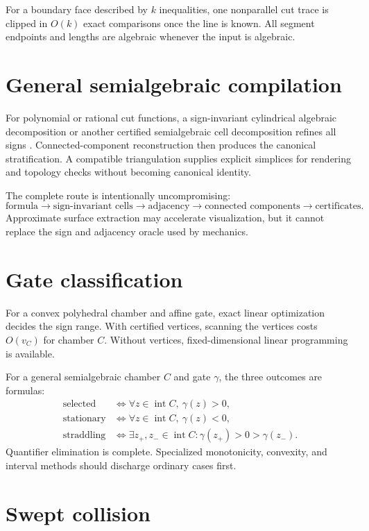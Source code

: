 \documentclass[11pt,openany]{book}
\newcommand{\Int}{\operatorname{int}}
\theoremstyle{polyplain}
\theoremstyle{polydef}
\begin{document}
For a boundary face described by $k$ inequalities, one nonparallel cut trace is clipped in $O(k)$ exact comparisons once the line is known. All segment endpoints and lengths are algebraic whenever the input is algebraic.

\section{General semialgebraic compilation}

For polynomial or rational cut functions, a sign-invariant cylindrical algebraic decomposition or another certified semialgebraic cell decomposition refines all signs \parencite{Collins1975,ArnonCollinsMcCallum1984,BasuPollackRoy2006}. Connected-component reconstruction then produces the canonical stratification. A compatible triangulation supplies explicit simplices for rendering and topology checks without becoming canonical identity.

The complete route is intentionally uncompromising:
\[
\text{formula}\longrightarrow\text{sign-invariant cells}\longrightarrow
\text{adjacency}\longrightarrow\text{connected components}\longrightarrow
\text{certificates}.
\]
Approximate surface extraction may accelerate visualization, but it cannot replace the sign and adjacency oracle used by mechanics.

\section{Gate classification}

For a convex polyhedral chamber and affine gate, exact linear optimization decides the sign range. With certified vertices, scanning the vertices costs $O(v_C)$ for chamber $C$. Without vertices, fixed-dimensional linear programming is available.

For a general semialgebraic chamber $C$ and gate $\gamma$, the three outcomes are formulas:
\begin{align*}
\text{selected}&\iff \forall z\in\Int C,\ \gamma(z)>0,\\
\text{stationary}&\iff \forall z\in\Int C,\ \gamma(z)<0,\\
\text{straddling}&\iff \exists z_+,z_-\in\Int C:
\gamma(z_+)>0>\gamma(z_-).
\end{align*}
Quantifier elimination is complete. Specialized monotonicity, convexity, and interval methods should discharge ordinary cases first.

\section{Swept collision}
\end{document}
